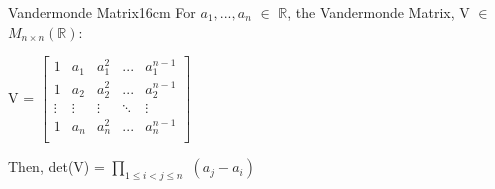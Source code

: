     \newpage



    \begin{wtheorem}{Vandermonde Matrix}{16cm}
        For $a_1,...,a_n$ $\in$ $\mathbb{R}$, the
        {\color{lblue} Vandermonde Matrix}, V $\in$ $M_{n \times n}(\mathbb{R})$:

        \hspace{0.5cm}
        V = 
        \footnotesize
        $\begin{bmatrix}
            1 & a_1 & a_1^2 & ... & a_1^{n-1} \\
            1 & a_2 & a_2^2 & ... & a_2^{n-1} \\
            \vdots & \vdots & \vdots & \ddots & \vdots \\
            1 & a_n & a_n^2 & ... & a_n^{n-1} \\
        \end{bmatrix}$
        \normalsize

        Then, det(V) = $\prod_{1 \leq i < j \leq n}$ $(a_j - a_i)$
    \end{wtheorem}

